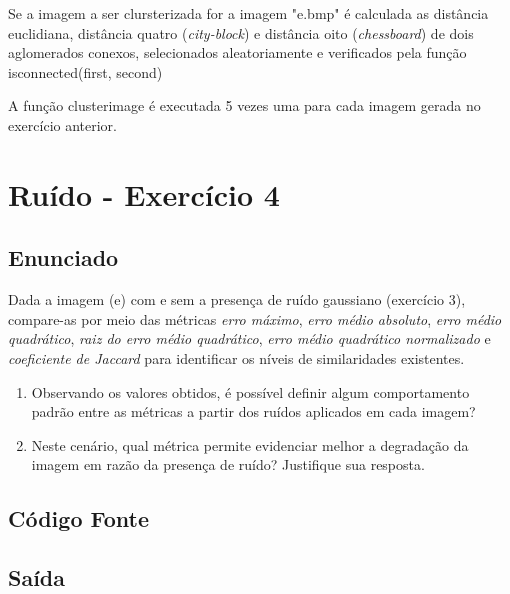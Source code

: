 \documentclass[10pt,a4paper]{article}
\begin{document}
\begin{flushleft}
Se a imagem a ser clursterizada for a imagem "e.bmp" é calculada as distância euclidiana, distância quatro (\textit{city-block}) e distância oito (\textit{chessboard}) de dois aglomerados conexos, selecionados aleatoriamente e verificados pela função {\ttfamily is\textunderscore connected(first, second)}
\end{flushleft}

 \begin{flushleft}
A função {\ttfamily cluster\textunderscore image} é executada 5 vezes uma para cada imagem gerada no exercício anterior.
\end{flushleft}



\section{Ruído - Exercício 4}

\subsection{Enunciado}

Dada a imagem (e) com e sem a presença de ruído gaussiano (exercício 3), compare-as por meio das métricas  \textit{erro máximo}, \textit{erro médio absoluto}, \textit{erro médio quadrático}, \textit{raiz do erro médio quadrático}, \textit{erro médio quadrático normalizado} e \textit{coeficiente de Jaccard} para identificar os níveis de similaridades existentes.

\begin{enumerate}[label=\roman*.]
    \item Observando os valores obtidos, é possível definir algum comportamento padrão entre as métricas a partir dos ruídos aplicados em cada imagem?
    \item Neste cenário, qual métrica permite evidenciar melhor a degradação da imagem em razão da presença de ruído? Justifique sua resposta.
\end{enumerate}

\subsection{Código Fonte}



\subsection{Saída}
\end{document}
